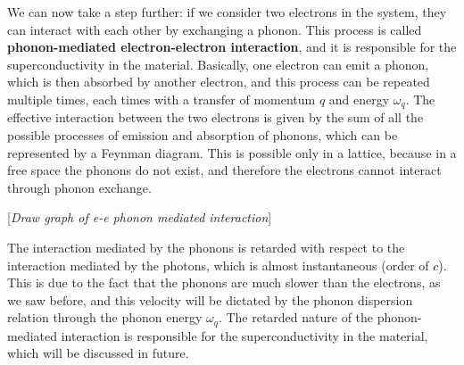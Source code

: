 We can now take a step further: if we consider two electrons in the system, they can interact with each other by exchanging a phonon. This process is called \textbf{phonon-mediated electron-electron interaction}, and it is responsible for the superconductivity in the material. Basically, one electron can emit a phonon, which is then absorbed by another electron, and this process can be repeated multiple times, each times with a transfer of momentum \(q\) and energy \(\omega_q\). The effective interaction between the two electrons is given by the sum of all the possible processes of emission and absorption of phonons, which can be represented by a Feynman diagram. This is possible only in a lattice, because in a free space the phonons do not exist, and therefore the electrons cannot interact through phonon exchange.

    [\textit{Draw graph of e-e phonon mediated interaction}]

The interaction mediated by the phonons is retarded with respect to the interaction mediated by the photons, which is almost instantaneous (order of \(c\)). This is due to the fact that the phonons are much slower than the electrons, as we saw before, and this velocity will be dictated by the phonon dispersion relation through the phonon energy \(\omega_q\). The retarded nature of the phonon-mediated interaction is responsible for the superconductivity in the material, which will be discussed in future.

